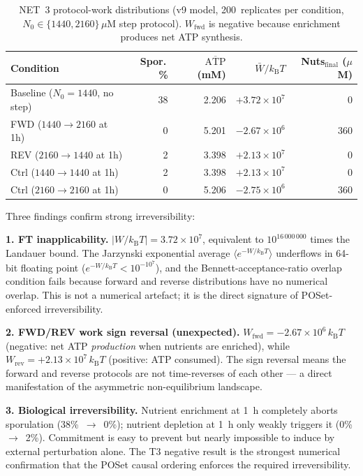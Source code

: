 \documentclass[11pt,a4paper]{article}
\newcommand{\kB}{k_{\mathrm{B}}}
\begin{document}
\begin{table}[h]
\centering
\caption{NET~3 protocol-work distributions (v9 model, 200~replicates per condition,
$N_0 \in \{1440, 2160\}\,\mu$M step protocol).
$W_{\mathrm{fwd}}$ is negative because enrichment produces net ATP synthesis.}
\label{tab:t3}
\begin{tabular}{lrrrr}
\toprule
Condition & Spor.\,\% & $\overline{\mathrm{ATP}}$ (mM) & $\bar W / \kB T$ & Nuts$_{\mathrm{final}}$ ($\mu$M) \\
\midrule
Baseline ($N_0{=}1440$, no step) & 38 & 2.206 & $+3.72\times10^{7}$ & 0 \\
FWD ($1440{\to}2160$ at 1h)      &  0 & 5.201 & $-2.67\times10^{6}$ & 360 \\
REV ($2160{\to}1440$ at 1h)      &  2 & 3.398 & $+2.13\times10^{7}$ & 0 \\
Ctrl ($1440{\to}1440$ at 1h)     &  2 & 3.398 & $+2.13\times10^{7}$ & 0 \\
Ctrl ($2160{\to}2160$ at 1h)     &  0 & 5.206 & $-2.75\times10^{6}$ & 360 \\
\bottomrule
\end{tabular}
\end{table}

Three findings confirm strong irreversibility:

\textbf{1.  FT inapplicability.}
$|W / \kB T| = 3.72\times10^7$, equivalent to $10^{16\,000\,000}$ times the
Landauer bound.  The Jarzynski exponential average
$\langle e^{-W/\kB T}\rangle$ underflows in 64-bit floating point
($e^{-W/\kB T} < 10^{-10^7}$), and the Bennett-acceptance-ratio overlap
condition fails because forward and reverse distributions have no numerical
overlap.  This is not a numerical artefact; it is the direct signature of
POSet-enforced irreversibility.

\textbf{2.  FWD/REV work sign reversal (unexpected).}
$W_{\mathrm{fwd}} = -2.67\times10^6\,\kB T$ (negative: net ATP
\emph{production} when nutrients are enriched), while
$W_{\mathrm{rev}} = +2.13\times10^7\,\kB T$ (positive: ATP consumed).
The sign reversal means the forward and reverse protocols are not
time-reverses of each other --- a direct manifestation of the
asymmetric non-equilibrium landscape.

\textbf{3.  Biological irreversibility.}
Nutrient enrichment at 1~h completely aborts sporulation
(38\%~$\to$~0\%); nutrient depletion at 1~h only weakly triggers it
(0\%~$\to$~2\%).  Commitment is easy to prevent but nearly impossible
to induce by external perturbation alone.  The T3 negative result is the
strongest numerical confirmation that the POSet causal ordering enforces
the required irreversibility.
\end{document}
